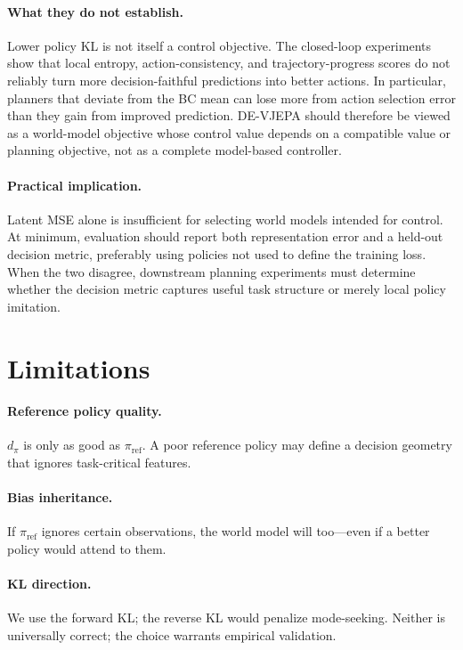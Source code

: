 \documentclass[10pt,twocolumn]{article}
\theoremstyle{tightstyle}
\begin{document}
\paragraph{What they do not establish.}
Lower policy KL is not itself a control objective. The closed-loop experiments
show that local entropy, action-consistency, and trajectory-progress scores do not
reliably turn more decision-faithful predictions into better actions. In
particular, planners that deviate from the BC mean can lose more from action
selection error than they gain from improved prediction. DE-VJEPA should therefore
be viewed as a world-model objective whose control value depends on a compatible
value or planning objective, not as a complete model-based controller.

\paragraph{Practical implication.}
Latent MSE alone is insufficient for selecting world models intended for control.
At minimum, evaluation should report both representation error and a held-out
decision metric, preferably using policies not used to define the training loss.
When the two disagree, downstream planning experiments must determine whether the
decision metric captures useful task structure or merely local policy imitation.

\section{Limitations}
\label{sec:limitations}

\paragraph{Reference policy quality.}
$d_\pi$ is only as good as $\pi_{\text{ref}}$.
A poor reference policy may define a decision geometry that ignores task-critical features.

\paragraph{Bias inheritance.}
If $\pi_{\text{ref}}$ ignores certain observations, the world model will too---even
if a better policy would attend to them.

\paragraph{KL direction.}
We use the forward KL; the reverse KL would penalize mode-seeking.
Neither is universally correct; the choice warrants empirical validation.
\end{document}
